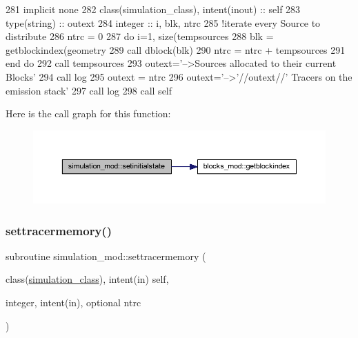\begin{DoxyCode}
281     \textcolor{keywordtype}{implicit none}
282     \textcolor{keywordtype}{class}(simulation\_class), \textcolor{keywordtype}{intent(inout)} :: self
283     \textcolor{keywordtype}{type}(string) :: outext
284     \textcolor{keywordtype}{integer} :: i, blk, ntrc
285     \textcolor{comment}{!iterate every Source to distribute}
286     ntrc = 0
287     \textcolor{keywordflow}{do} i=1, \textcolor{keyword}{size}(tempsources%
288         blk = getblockindex(geometry%
289         \textcolor{keyword}{call }dblock(blk)%
290         ntrc = ntrc + tempsources%
291 \textcolor{keywordflow}{    end do}
292     \textcolor{keyword}{call }tempsources%
293     outext=\textcolor{stringliteral}{'-->Sources allocated to their current Blocks'}
294     \textcolor{keyword}{call }log%
295     outext = ntrc
296     outext=\textcolor{stringliteral}{'-->'}//outext//\textcolor{stringliteral}{' Tracers on the emission stack'}
297     \textcolor{keyword}{call }log%
298     \textcolor{keyword}{call }self%
\end{DoxyCode}
Here is the call graph for this function\+:
\nopagebreak
\begin{figure}[H]
\begin{center}
\leavevmode
\includegraphics[width=350pt]{namespacesimulation__mod_a447c6d709de6aa360a65d39d660e627b_cgraph}
\end{center}
\end{figure}
\mbox{\label{namespacesimulation__mod_acc5fa823c8dd599de8feda8988c224f2}} 
\subsubsection{\texorpdfstring{settracermemory()}{settracermemory()}}
{\footnotesize\ttfamily subroutine simulation\+\_\+mod\+::settracermemory (\begin{DoxyParamCaption}\item[{class(\mbox{\hyperlink{structsimulation__mod_1_1simulation__class}{simulation\+\_\+class}}), intent(in)}]{self,  }\item[{integer, intent(in), optional}]{ntrc }\end{DoxyParamCaption})\hspace{0.3cm}{\ttfamily [private]}}



